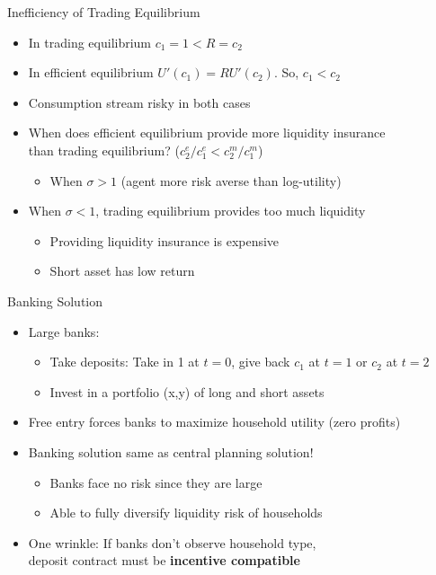 \documentclass[11pt,aspectratio=169,xcolor={dvipsnames},hyperref={pdftex,pdfpagemode=UseNone,hidelinks,pdfdisplaydoctitle=true},usepdftitle=false]{beamer}
\begin{document}
\begin{frame}{Inefficiency of Trading Equilibrium}
\begin{itemize}
	\itemsep1em 
	\item In trading equilibrium $c_1 = 1 < R = c_2$
	\item In efficient equilibrium $U'(c_1) = RU'(c_2)$. So, $c_1 < c_2$
	\item Consumption stream risky in both cases
	\item When does efficient equilibrium provide more liquidity insurance \\ than trading equilibrium? ($c_2^e/c_1^e < c_2^m / c_1^m$)
	\begin{itemize}
		\item When $\sigma > 1$ (agent more risk averse than log-utility)
	\end{itemize}
	\item When $\sigma < 1$, trading equilibrium provides too much liquidity
	\begin{itemize}
		\item Providing liquidity insurance is expensive
		\item Short asset has low return
	\end{itemize}
\end{itemize}
\end{frame}


\begin{frame}{Banking Solution}
\begin{itemize}
	\itemsep1em 
	\item Large banks:
	\begin{itemize}
		\item Take deposits: Take in 1 at $t=0$, give back $c_1$ at $t=1$ or $c_2$ at $t=2$
		\item Invest in a portfolio (x,y) of long and short assets
	\end{itemize}
	\item Free entry forces banks to maximize household utility (zero profits)
	\item Banking solution same as central planning solution!
	\begin{itemize}
		\item Banks face no risk since they are large
		\item Able to fully diversify liquidity risk of households
	\end{itemize}
	\item One wrinkle: If banks don't observe household type, \\ deposit contract must be \textbf{incentive compatible}  
\end{itemize}
\end{frame}
\end{document}

